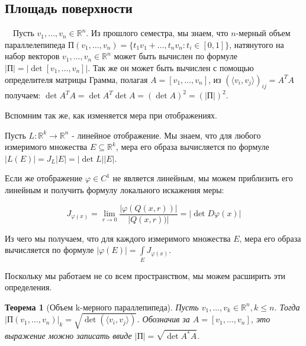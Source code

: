 \documentclass[a5paper]{article}
\newcounter{through}
\theoremstyle{plain}
\newtheorem{theorem}[through]{Теорема}
\theoremstyle{definition}
\numberwithin{through}{section}
\numberwithin{equation}{section}
\begin{document}

\subsection{Площадь поверхности}

~~Пусть $v_1, \ldots, v_n \in \mathbb{R}^n$. 
Из прошлого семестра, мы знаем, что $n$-мерный объем параллелепипеда
 $\text{П} (v_1, \ldots, v_n)= \{ t_1 v_1 + \ldots, t_n v_n : t_i \in [0, 1] \}$, 
 натянутого на набор векторов $v_1, \ldots, v_n \in \mathbb{R}^n$ может быть вычислен по формуле 
 $|\text{П}| = | \det [v_1, \ldots, v_n] |$. 
 Так же он может быть вычислен с помощью определителя матрицы Грамма, полагая 
 $A = [v_1, \ldots, v_n]$, из $(\langle v_i, v_j \rangle)_{ij}=A^{T}A$ получаем:
  $\det A^{T}A = \det A^T \det A = (\det A)^2 = (| \text{П} |)^2$.

Вспомним так же, как изменяется мера при отображениях.

Пусть $L : \mathbb{R}^k \to \mathbb{R}^n$ - линейное отображение. Мы знаем, что для любого измеримого множества $E \subseteq \mathbb{R}^k$, мера его образа вычисляется по формуле $| L(E) | = J_L | E | = | \det L | | E |$.

Если же отображение $\varphi \in C^1$ не является линейным, мы можем приблизить его линейным и получить формулу локального искажения меры:

\begin{equation*}
J_{\varphi(x)} = \lim\limits_{r \to 0} \frac{| \varphi(Q(x,r) ) |}{| Q(x,r)) |} = | \det D \varphi(x) |
\end{equation*}

Из чего мы получаем, что для каждого измеримого множества $E$, мера его образа вычисляется по формуле $| \varphi(E) | = \int\limits_{E} J_{\varphi(x)}$.

Поскольку мы работаем не со всем пространством, мы можем расширить эти определения.

\begin{theorem}[Объем k-мерного параллепипеда]
	Пусть $v_1, \ldots, v_k \in \mathbb{R}^n, k \leq n$. Тогда $| \text{П} (v_1, \ldots, v_n) |_k = \sqrt{\det(\langle v_i, v_j \rangle)}$. Обозначив за $A = [v_1, \ldots, v_n]$, это выражение можно записать ввиде $| \text{П} | = \sqrt{\det A^* A}$.
\end{theorem}
\end{document}
